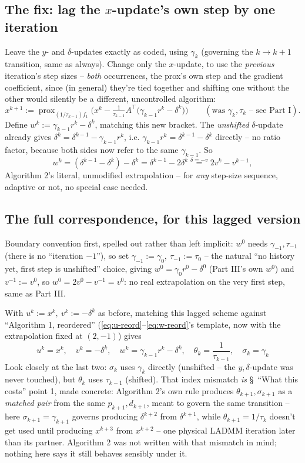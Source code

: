 \documentclass[11pt]{article}
\newcommand{\prox}{\operatorname{prox}}
\begin{document}
\subsection*{The fix: lag the $x$-update's own step by one iteration}
Leave the $y$- and $\delta$-updates exactly as coded, using $\gamma_k$ (governing the
$k\to k{+}1$ transition, same as always). Change only the $x$-update, to use the
\emph{previous} iteration's step sizes -- \emph{both} occurrences, the prox's own step
and the gradient coefficient, since (in general) they're tied together and shifting one
without the other would silently be a different, uncontrolled algorithm:
\[
x^{k+1} := \prox_{(1/\tau_{k-1})f_1}\Big(x^k - \tfrac1{\tau_{k-1}}A^\top\big(\gamma_{k-1}r^k-\delta^k\big)\Big)
\qquad(\text{was }\gamma_k,\tau_k\text{ -- see Part I}).
\]
Define $w^k:=\gamma_{k-1}r^k-\delta^k$, matching this new bracket. The \emph{unshifted}
$\delta$-update already gives $\delta^k=\delta^{k-1}-\gamma_{k-1}r^k$, i.e.
$\gamma_{k-1}r^k=\delta^{k-1}-\delta^k$ directly -- no ratio factor, because both sides
now refer to the same $\gamma_{k-1}$. So
\[
w^k=(\delta^{k-1}-\delta^k)-\delta^k=\delta^{k-1}-2\delta^k
\overset{\delta=-v}{=}2v^k-v^{k-1},
\]
Algorithm 2's literal, unmodified extrapolation -- for \emph{any} step-size sequence,
adaptive or not, no special case needed.

\subsection*{The full correspondence, for this lagged version}
Boundary convention first, spelled out rather than left implicit: $w^0$ needs
$\gamma_{-1},\tau_{-1}$ (there is no ``iteration $-1$''), so set
$\gamma_{-1}:=\gamma_0,\ \tau_{-1}:=\tau_0$ -- the natural ``no history yet, first step
is unshifted'' choice, giving $w^0=\gamma_0r^0-\delta^0$ (Part III's own $w^0$) and
$v^{-1}:=v^0$, so $w^0=2v^0-v^{-1}=v^0$: no real extrapolation on the very first step,
same as Part III.

With $u^k:=x^k,\ v^k:=-\delta^k$ as before, matching this lagged scheme against
``Algorithm 1, reordered'' (\eqref{eq:u-reord}--\eqref{eq:w-reord}'s template, now with
the extrapolation fixed at $(2,-1)$) gives
\[
\boxed{u^k=x^k,\quad v^k=-\delta^k,\quad w^k=\gamma_{k-1}r^k-\delta^k,\quad
\theta_k=\frac1{\tau_{k-1}},\quad \sigma_k=\gamma_k}
\]
Look closely at the last two: $\sigma_k$ uses $\gamma_k$ directly (unshifted -- the
$y,\delta$-update was never touched), but $\theta_k$ uses $\tau_{k-1}$ (shifted). That
index mismatch \emph{is} \S~``What this costs'' point 1, made concrete: Algorithm 2's
own rule produces $\theta_{k+1},\sigma_{k+1}$ as a \emph{matched pair} from the same
$p_{k+1},d_{k+1}$, meant to govern the same transition -- here $\sigma_{k+1}=\gamma_{k+1}$
governs producing $\delta^{k+2}$ from $\delta^{k+1}$, while $\theta_{k+1}=1/\tau_k$
doesn't get used until producing $x^{k+3}$ from $x^{k+2}$ -- one physical LADMM
iteration later than its partner. Algorithm 2 was not written with that mismatch in
mind; nothing here says it still behaves sensibly under it.
\end{document}
